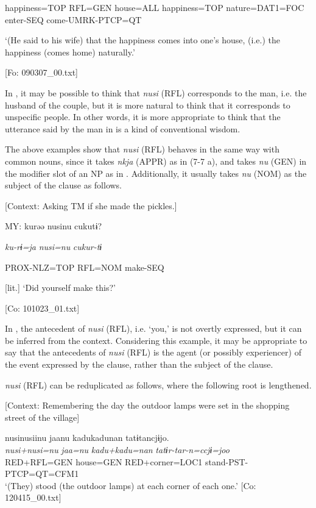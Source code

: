     happiness=TOP  RFL=GEN  house=ALL  happiness=TOP  nature=DAT1=FOC  enter-SEQ  come-UMRK-PTCP=QT

    ‘(He said to his wife) that the happiness comes into one’s house, (i.e.) the happiness (comes home) naturally.’

    [Fo: 090307\_00.txt]
\z

In , it may be possible to think that \textit{nusi} (RFL) corresponds to the man, i.e. the husband of the couple, but it is more natural to think that it corresponds to unspecific people. In other words, it is more appropriate to think that the utterance said by the man in  is a kind of conventional wisdom.

  The above examples show that \textit{nusi} (RFL) behaves in the same way with common nouns, since it takes \textit{nkja} (APPR) as in (7-7 a), and takes \textit{nu} (GEN) in the modifier slot of an NP as in . Additionally, it usually takes \textit{nu} (NOM) as the subject of the clause as follows.

\ea \label{ex:7:9}  [Context: Asking TM if she made the pickles.]

  MY:  kurəə  nusinu  cukutɨ?

    \textit{ku-rɨ=ja}  \textit{nusi=nu}  \textit{cukur-tɨ}

    PROX-NLZ=TOP  RFL=NOM  make-SEQ

    [lit.] ‘Did yourself make this?’

    [Co: 101023\_01.txt]
\z

In , the antecedent of \textit{nusi} (RFL), i.e. ‘you,’ is not overtly expressed, but it can be inferred from the context. Considering this example, it may be appropriate to say that the antecedents of \textit{nusi} (RFL) is the agent (or possibly experiencer) of the event expressed by the clause, rather than the subject of the clause.

\textit{nusi} (RFL) can be reduplicated as follows, where the following root is lengthened.

\ea \label{ex:7:10}  [Context: Remembering the day the outdoor lamps were set in the shopping street of the village]

\glll  nusinusiinu  jaanu  kadukadunan  tatɨtancjɨjo.\\
\textit{nusi+nusi=nu}  \textit{jaa=nu}  \textit{kadu+kadu=nan}  \textit{tatɨr-tar-n=ccjɨ=joo}\\
RED+RFL=GEN  house=GEN  RED+corner=LOC1  stand-PST-PTCP=QT=CFM1\\
\glt ‘(They) stood (the outdoor lamps) at each corner of each one.’ [Co: 120415\_00.txt]
\z

